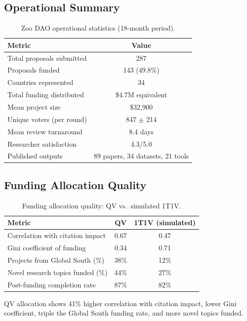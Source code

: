 \documentclass[11pt,a4paper]{article}
\begin{document}
\subsection{Operational Summary}

\begin{table}[H]
\centering
\caption{Zoo DAO operational statistics (18-month period).}
\label{tab:ops}
\begin{tabular}{lc}
\toprule
\textbf{Metric} & \textbf{Value} \\
\midrule
Total proposals submitted & 287 \\
Proposals funded & 143 (49.8\%) \\
Countries represented & 34 \\
Total funding distributed & \$4.7M equivalent \\
Mean project size & \$32{,}900 \\
Unique voters (per round) & 847 $\pm$ 214 \\
Mean review turnaround & 8.4 days \\
Researcher satisfaction & 4.3/5.0 \\
Published outputs & 89 papers, 34 datasets, 21 tools \\
\bottomrule
\end{tabular}
\end{table}

\subsection{Funding Allocation Quality}

\begin{table}[H]
\centering
\caption{Funding allocation quality: QV vs.\ simulated 1T1V.}
\label{tab:allocation}
\begin{tabular}{lcc}
\toprule
\textbf{Metric} & \textbf{QV} & \textbf{1T1V (simulated)} \\
\midrule
Correlation with citation impact & 0.67 & 0.47 \\
Gini coefficient of funding & 0.34 & 0.71 \\
Projects from Global South (\%) & 38\% & 12\% \\
Novel research topics funded (\%) & 44\% & 27\% \\
Post-funding completion rate & 87\% & 82\% \\
\bottomrule
\end{tabular}
\end{table}

QV allocation shows 41\% higher correlation with citation impact, lower
Gini coefficient, triple the Global South funding rate, and more novel
topics funded.
\end{document}
